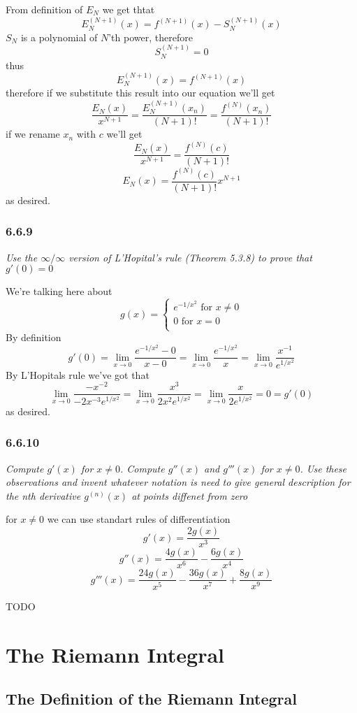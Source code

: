 \documentclass[11pt,oneside,titlepage]{book}
\begin{document}
From definition of $E_N$ we get thtat
$$E_N^{(N + 1)}(x) = f^{(N + 1)}(x) - S_N^{(N + 1)}(x)$$
$S_N$ is a polynomial of $N$'th power, therefore
$$S_N^{(N + 1)} = 0$$
thus
$$E_N^{(N + 1)}(x) = f^{(N + 1)}(x)$$
therefore if we substitute this result into our equation we'll get
$$\frac{E_N(x)}{x^{N + 1}} =
\frac{E_N^{(N + 1)}(x_n)}{(N + 1)!} = \frac{f^{(N)}(x_n)}{(N + 1)!} $$
if we rename $x_n$ with $c$ we'll get 
$$\frac{E_N(x)}{x^{N + 1}} = \frac{f^{(N)}(c)}{(N + 1)!} $$
$$E_N(x) = \frac{f^{(N)}(c)}{(N + 1)!} x^{N + 1}$$
as desired.

\subsection*{6.6.9}
\textit{Use the $\infty/\infty$ version of L'Hopital's rule (Theorem 5.3.8) to
  prove that $g'(0) = 0$}

We're talking here about
$$g(x) =
\begin{cases}
  e^{-1/x^2} \text{ for } x \neq 0 \\
  0 \text{ for } x = 0 \\
\end{cases}
$$
By definition
$$g'(0) = \lim_{x \to 0}{\frac{e^{-1/x^2} - 0}{x - 0}} =
\lim_{x \to 0}{\frac{e^{-1/x^2}}{x}} =
\lim_{x \to 0}{\frac{x^{-1}}{e^{1/x^2}}}$$
By L'Hopitals rule we've got that
$$\lim_{x \to 0}{\frac{- x^{-2}}{-2x^{-3}e^{1/x^2}}} =
\lim_{x \to 0}{\frac{x^{3}}{2x^{2}e^{1/x^2}}} =
\lim_{x \to 0}{\frac{x}{2e^{1/x^2}}} = 0 = g'(0)
$$
as desired.

\subsection*{6.6.10}
\textit{Compute $g'(x)$ for $x \neq 0$. Compute $g''(x)$ and $g'''(x)$ for
  $x \neq 0$. Use these observations and invent whatever notation is need to
  give general description for the nth derivative $g^{(n)}(x)$ at points
  diffenet from zero}

for $x \neq 0$ we can use standart rules of differentiation
$$g'(x) = \frac{2 g(x)}{x^3}$$
$$g''(x) = \frac{4 g(x)}{x^6} - \frac{6 g(x)}{x^4}$$
$$g'''(x) = \frac{24 g(x)}{x^5} - \frac{36 g(x)}{x^7} + \frac{8 g(x)}{x^9}$$

TODO

\chapter{The Riemann Integral}

\section{The Definition of the Riemann Integral}
\end{document}
